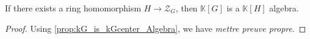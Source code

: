 \begin{proposition}
    \label{prop:kG_is_kH_Algebra}
    \leanok
    If there exists a ring homomorphism $H\rightarrow \mathcal{Z}_G$, then $\mathbb{K}[G]$
    is a $\mathbb{K}[H]$ algebra.
\end{proposition}
\begin{proof}
    \leanok
    Using \ref{prop:kG_is_kGcenter_Algebra}, we have \textit{mettre preuve propre}.
\end{proof}